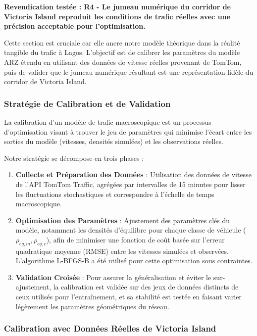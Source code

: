 \textbf{Revendication testée : R4 - Le jumeau numérique du corridor de Victoria Island reproduit les conditions de trafic réelles avec une précision acceptable pour l'optimisation.}

Cette section est cruciale car elle ancre notre modèle théorique dans la réalité tangible du trafic à Lagos. L'objectif est de calibrer les paramètres du modèle ARZ étendu en utilisant des données de vitesse réelles provenant de TomTom, puis de valider que le jumeau numérique résultant est une représentation fidèle du corridor de Victoria Island.

\subsubsection{Stratégie de Calibration et de Validation}
\label{subsec:strategie_calibration}

La calibration d'un modèle de trafic macroscopique est un processus d'optimisation visant à trouver le jeu de paramètres qui minimise l'écart entre les sorties du modèle (vitesses, densités simulées) et les observations réelles.

Notre stratégie se décompose en trois phases :
\begin{enumerate}
    \item \textbf{Collecte et Préparation des Données} : Utilisation des données de vitesse de l'API TomTom Traffic, agrégées par intervalles de 15 minutes pour lisser les fluctuations stochastiques et correspondre à l'échelle de temps macroscopique.
    \item \textbf{Optimisation des Paramètres} : Ajustement des paramètres clés du modèle, notamment les densités d'équilibre pour chaque classe de véhicule ($\rho_{eq,m}, \rho_{eq,c}$), afin de minimiser une fonction de coût basée sur l'erreur quadratique moyenne (RMSE) entre les vitesses simulées et observées. L'algorithme L-BFGS-B a été utilisé pour cette optimisation sous contraintes.
    \item \textbf{Validation Croisée} : Pour assurer la généralisation et éviter le sur-ajustement, la calibration est validée sur des jeux de données distincts de ceux utilisés pour l'entraînement, et sa stabilité est testée en faisant varier légèrement les paramètres géométriques du réseau.
\end{enumerate}

\subsubsection{Calibration avec Données Réelles de Victoria Island}
\label{subsec:calibration_victoria_island}

